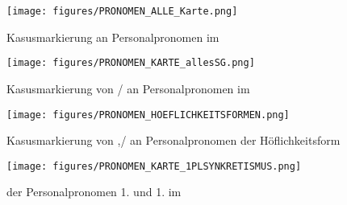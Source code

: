  	\begin{figure} 

\texttt{[image: figures/PRONOMEN\_ALLE\_Karte.png]}
		\caption{\label{kartePRON1} Kasusmarkierung an Personalpronomen im }
		\end{figure}
		
	
	\begin{figure} 

\texttt{[image: figures/PRONOMEN\_KARTE\_allesSG.png]}
		\caption{\label{kartePRON2} Kasusmarkierung von {\Akk}/{\Dat} an Personalpronomen im {\Sg}}
		\end{figure}
		

	
\begin{figure} 

\texttt{[image: figures/PRONOMEN\_HOEFLICHKEITSFORMEN.png]}
		\caption{\label{kartePRON3} Kasusmarkierung von {\Nom},{\Akk}/{\Dat} an Personalpronomen der Höflichkeitsform}
		\end{figure}
		
  

\begin{figure} 

\texttt{[image: figures/PRONOMEN\_KARTE\_1PLSYNKRETISMUS.png]}
		\caption{\label{kartePRON4}  der Personalpronomen 1. {\Pl} {\Nom} und 1. {\Sg} {\Dat} im }
		\end{figure}
	



